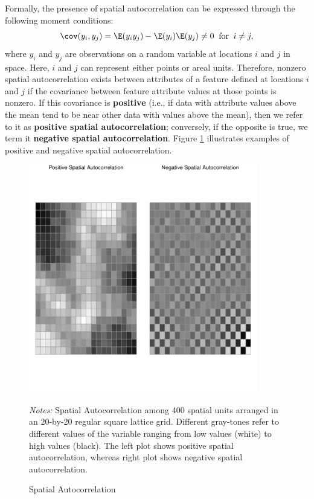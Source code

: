\documentclass[english,12pt]{book}\usepackage[]{graphicx}\usepackage[]{xcolor}
\newenvironment{knitrout}{}{} %
\begin{document}
Formally, the presence of spatial autocorrelation can be expressed through the following moment conditions:
\begin{equation*}
  \cov(y_i, y_j) = \E(y_iy_j) - \E(y_i)\E(y_j) \neq 0 \;\; \text{for} \;\; i \neq j,
\end{equation*}
%
where $y_i$ and $y_j$ are observations on a random variable at locations $i$ and $j$ in space. Here, $i$ and $j$ can represent either points or areal units. Therefore, nonzero spatial autocorrelation exists between attributes of a feature defined at locations $i$ and $j$ if the covariance between feature attribute values at those points is nonzero. If this covariance is \textbf{positive} (i.e., if data with attribute values above the mean tend to be near other data with values above the mean), then we refer to it as \textbf{positive spatial autocorrelation}; conversely, if the opposite is true, we term it \textbf{negative spatial autocorrelation}. Figure \ref{fig:Autocorrelation} illustrates examples of positive and negative spatial autocorrelation.

\begin{figure}[ht]
  \caption{Spatial Autocorrelation}
    \label{fig:Autocorrelation}
    \centering
    	\begin{minipage}{1\linewidth}
\begin{knitrout}
\color{fgcolor}

{\centering \includegraphics[width=10cm,height=10cm]{figure/Autocorrelation-1} 

}


\end{knitrout}
\footnotesize
		\emph{Notes:} Spatial Autocorrelation among 400 spatial units arranged in an 20-by-20 regular square lattice grid. Different gray-tones refer to different values of the variable ranging from low values (white) to high values (black). The left plot shows positive spatial autocorrelation, whereas right plot shows negative spatial autocorrelation. 
	\end{minipage}	
\end{figure}
\end{document}
